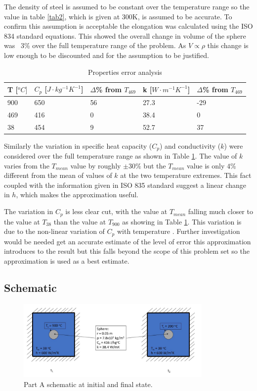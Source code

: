 \documentclass[11pt]{article}
\begin{document}
The density of steel is assumed to be constant over the temperature range so the value in table \ref{tab2}, which is given at 300K, is assumed to be accurate. To confirm this assumption is acceptable the elongation was calculated using the ISO 834 standard equations\cite{jean-marc_franssen_fire_2015}. This showed the overall change in volume of the sphere was ~3\% over the full temperature range of the problem. As $V \propto \rho$ this change is low enough to be discounted and for the assumption to be justified.

\begin{table}[h]
	\centering
	\caption{Properties error analysis}
	\begin{tabular}{lllll}
		T [$^{o}C]$ & $C_{p}$ [$J \cdot kg^{-1}K^{-1}$] & $\Delta$\% from $T_{469}$ & k [$W \cdot m^{-1}K^{-1}$] & $\Delta$\% from $T_{469}$ \\ \hline
		900 & 650 & 56 & 27.3 & -29 \\
		469 & 416 & 0 & 38.4 & 0 \\
		38 & 454 & 9 & 52.7 & 37
	\end{tabular}
	\label{tab3}
\end{table}

Similarly the variation in specific heat capacity ($C_p$) and conductivity ($k$) were considered over the full temperature range as shown in Table \ref{tab3}. The value of $k$ varies from the $T_{mean}$ value by roughly $\pm 30\%$  but the $T_{mean}$ value is only $4\%$ different from the mean of values of $k$ at the two temperature extremes. This fact coupled with the information given in ISO 835 standard \cite{jean-marc_franssen_fire_2015} suggest a linear change in $h$, which makes the approximation useful. 

The variation in $C_p$ is less clear cut, with the value at $T_{mean}$ falling much closer to the value at $T_{38}$ than the value at $T_{900}$ as showing in Table \ref{tab3}. This variation is due to the non-linear variation of $C_p$ with temperature \cite{jean-marc_franssen_fire_2015}. Further investigation would be needed get an accurate estimate of the level of error this approximation introduces to the result but this falls beyond the scope of this problem set so the approximation is used as a best estimate.
\pagebreak
\subsection{Schematic}
\begin{figure}[!htbp]
	\centering
	\includegraphics[width=0.85\textwidth]{part_a_fig}
	\caption{Part A schematic at initial and final state.}
	\label{fig:schem_a}
\end{figure}
\FloatBarrier
\end{document}
